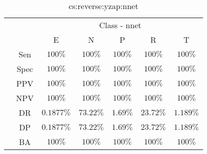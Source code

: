 \begin{table}[!ht]
	\centering
	\begin{tabular}{|c|c|c|c|c|c|c|}
		\cline{3-7}
		\multicolumn{2}{c|}{} & \multicolumn{5}{c|}{Class - nnet} \\ \cline{3-7}
		\multicolumn{2}{c|}{} & E & N & P & R & T \\ \hline
		\multirow{7}{*}{\rotatebox{90}{Statistics}} & Sen & $100\%$ & $100\%$ & $100\%$ & $100\%$ & $100\%$ \\ \cline{2-7}
		 & Spec & $100\%$ & $100\%$ & $100\%$ & $100\%$ & $100\%$ \\ \cline{2-7}
		 & PPV & $100\%$ & $100\%$ & $100\%$ & $100\%$ & $100\%$ \\ \cline{2-7}
		 & NPV & $100\%$ & $100\%$ & $100\%$ & $100\%$ & $100\%$ \\ \cline{2-7}
		 & DR & $0.1877\%$ & $73.22\%$ & $1.69\%$ & $23.72\%$ & $1.189\%$ \\ \cline{2-7}
		 & DP & $0.1877\%$ & $73.22\%$ & $1.69\%$ & $23.72\%$ & $1.189\%$ \\ \cline{2-7}
		 & BA & $100\%$ & $100\%$ & $100\%$ & $100\%$ & $100\%$ \\ \hline
	\end{tabular}
	\caption{cs:reverse:yzap:nnet}
	\label{tab:cs:reverse:yzap:nnet}
\end{table}

